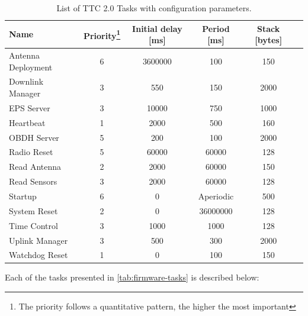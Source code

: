 \begin{table}[!ht]
    \centering

    \begin{tabular}{lccccc}
        \toprule[1.5pt]
        \textbf{Name}          & \textbf{Priority\footnote{The priority follows a quantitative pattern, the higher the most important}} & \textbf{Initial delay [ms]} & \textbf{Period [ms]} & \textbf{Stack [bytes]} \\
        \midrule
        Antenna Deployment     & 6  & 3600000 & 100       & 150  \\
        Downlink Manager       & 3  & 550     & 150       & 2000 \\
        EPS Server             & 3  & 10000   & 750       & 1000 \\
        Heartbeat              & 1  & 2000    & 500       & 160  \\
        OBDH Server            & 5  & 200     & 100       & 2000 \\
        Radio Reset            & 5  & 60000   & 60000     & 128  \\
        Read Antenna           & 2  & 2000    & 60000     & 150  \\
        Read Sensors           & 3  & 2000    & 60000     & 128  \\
        Startup                & 6  & 0       & Aperiodic & 500  \\
        System Reset           & 2  & 0       & 36000000  & 128  \\
        Time Control           & 3  & 1000    & 1000      & 128  \\
        Uplink Manager         & 3  & 500     & 300       & 2000 \\
        Watchdog Reset         & 1  & 0       & 100       & 150  \\
        \bottomrule[1.5pt]
    \end{tabular}
    \caption{List of TTC 2.0 Tasks with configuration parameters.}
    \label{tab:firmware-tasks}
\end{table}

Each of the tasks presented in \autoref{tab:firmware-tasks} is described below:

